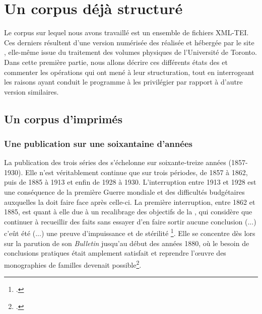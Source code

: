 \part{Un corpus déjà structuré}

\clearpage
\thispagestyle{empty}
\cleardoublepage
{}
Le corpus sur lequel nous avons travaillé est un ensemble de fichiers XML-TEI. Ces derniers résultent d'une version numérisée des \odm{} réalisée et hébergée par le site \ia, elle-même issue du traitement des volumes physiques de l'Université de Toronto. Dans cette première partie, nous allons décrire ces différents états des \odm{} et commenter les opérations qui ont mené à leur structuration, tout en interrogeant les raisons ayant conduit le programme \timeus{} à les privilégier par rapport à d'autre version similaires.

\chapter{Un corpus d'imprimés}

\section{Une publication sur une soixantaine d'années}

La publication des trois séries des \odm{} s'échelonne sur soixante-treize années (1857-1930). Elle n'est véritablement continue que sur trois périodes, de 1857 à 1862, puis de 1885 à 1913 et enfin de 1928 à 1930. L'interruption entre 1913 et 1928 est une conséquence de la première Guerre mondiale et des difficultés budgétaires auxquelles la \sess{} doit faire face après celle-ci. La première interruption, entre 1862 et 1885, est quant à elle due à un recalibrage des objectifs de la \sess, qui considère que \og continuer à recueillir des faits sans essayer d'en faire sortir aucune conclusion (...) c'eût été (...) une preuve d'impuissance et de stérilité \fg{}\footcite[p. I]{averts1t5}. Elle se concentre dès lors sur la parution de son \textit{Bulletin} jusqu'au début des années 1880, où \og le besoin de conclusions pratiques était amplement satisfait \fg{} et \og reprendre l'œuvre des monographies de familles \fg{} devenait possible\footcite[p. II]{averts1t5}.

